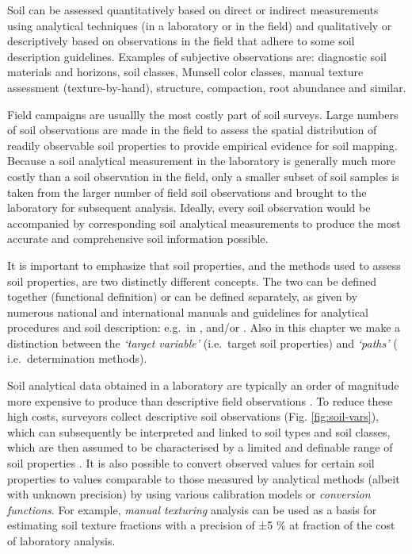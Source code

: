 \documentclass[graybox,natbib,nospthms,UStrade]{svmono}
\let\BeginKnitrBlock\begin \let\EndKnitrBlock\end
\let\BeginKnitrBlock\begin \let\EndKnitrBlock\end
\begin{document}
\BeginKnitrBlock{rmdnote}
Soil can be assessed quantitatively based on direct or indirect
measurements using analytical techniques (in a laboratory or in the
field) and qualitatively or descriptively based on observations in the
field that adhere to some soil description guidelines. Examples of
subjective observations are: diagnostic soil materials and horizons,
soil classes, Munsell color classes, manual texture assessment
(texture-by-hand), structure, compaction, root abundance and similar.
\EndKnitrBlock{rmdnote}

Field campaigns are usuallly the most costly part of soil surveys. Large numbers
of soil observations are made in the field to assess the spatial
distribution of readily observable soil properties to provide empirical
evidence for soil mapping. Because a soil analytical measurement in the
laboratory is generally much more costly than a soil observation in the field,
only a smaller subset of soil samples is taken from the larger number of
field soil observations and brought to the laboratory for subsequent analysis.
Ideally, every soil observation would be accompanied by corresponding soil analytical
measurements to produce the most accurate and comprehensive soil information possible.

It is important to emphasize that soil properties, and the methods used to assess
soil properties, are two distinctly different concepts. The two can
be defined together (functional definition) or can be defined
separately, as given by numerous national and international manuals and
guidelines for analytical procedures and soil description: e.g.~in
\citeauthor{Burt2004SSIR} \citetext{\citeyear{Burt2004SSIR}; \citealp{carter2007soil}; \citealp{food2006guidelines}}, and/or
\citet{VanReeuwijk2002}. Also in this chapter we make a distinction between the
\emph{`target variable'} (i.e.~target soil properties) and \emph{`paths'} (
i.e.~determination methods).

Soil analytical data obtained in a laboratory are typically an order of
magnitude more expensive to produce than descriptive field observations
\citep{Burrough1971, GehlRice2005, Kempen2011PhDthesis}. To reduce these
high costs, surveyors collect descriptive soil observations (Fig. \ref{fig:soil-vars}),
which can subsequently be interpreted and linked to soil types and soil classes,
which are then assumed to be characterised by a limited and definable range
of soil properties \citep{bouma1998exploring}. It is also possible to convert
observed values for certain soil properties to values comparable to
those measured by analytical methods (albeit with unknown precision) by
using various calibration models or \emph{conversion functions}. For example,
\emph{manual texturing} analysis \citep{FAO1990, SSDS1993} can be used as a basis for estimating
soil texture fractions with a precision of ±5 \% at fraction of
the cost of laboratory analysis.
\end{document}
